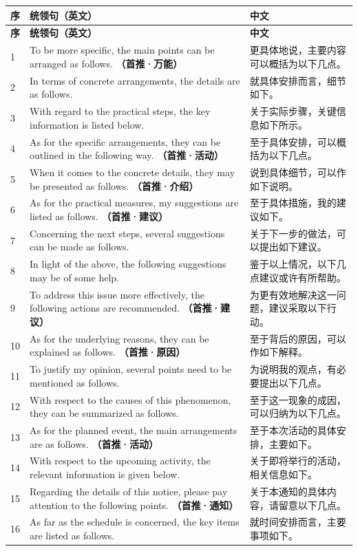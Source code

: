 \documentclass[11pt,a4paper]{ctexart}
\newcommand{\kw}[1]{{\bfseries\color{accent}#1}}
\begin{document}
\begin{longtable}{L{0.9cm}L{10.4cm}L{4.5cm}}
\toprule
\textbf{序} & \textbf{统领句（英文）} & \textbf{中文} \\
\midrule
\endfirsthead
\toprule
\textbf{序} & \textbf{统领句（英文）} & \textbf{中文} \\
\midrule
\endhead
\bottomrule
\endlastfoot

1 & To be more specific, the main points can be arranged as follows. \kw{（首推·万能）} & 更具体地说，主要内容可以概括为以下几点。 \\
2 & In terms of concrete arrangements, the details are as follows. & 就具体安排而言，细节如下。 \\
3 & With regard to the practical steps, the key information is listed below. & 关于实际步骤，关键信息如下所示。 \\
4 & As for the specific arrangements, they can be outlined in the following way. \kw{（首推·活动）} & 至于具体安排，可以概括为以下几点。 \\
5 & When it comes to the concrete details, they may be presented as follows. \kw{（首推·介绍）} & 说到具体细节，可以作如下说明。 \\
6 & As for the practical measures, my suggestions are listed as follows. \kw{（首推·建议）} & 至于具体措施，我的建议如下。 \\
7 & Concerning the next steps, several suggestions can be made as follows. & 关于下一步的做法，可以提出如下建议。 \\
8 & In light of the above, the following suggestions may be of some help. & 鉴于以上情况，以下几点建议或许有所帮助。 \\
9 & To address this issue more effectively, the following actions are recommended. \kw{（首推·建议）} & 为更有效地解决这一问题，建议采取以下行动。 \\
10 & As for the underlying reasons, they can be explained as follows. \kw{（首推·原因）} & 至于背后的原因，可以作如下解释。 \\
11 & To justify my opinion, several points need to be mentioned as follows. & 为说明我的观点，有必要提出以下几点。 \\
12 & With respect to the causes of this phenomenon, they can be summarized as follows. & 至于这一现象的成因，可以归纳为以下几点。 \\
13 & As for the planned event, the main arrangements are as follows. \kw{（首推·活动）} & 至于本次活动的具体安排，主要如下。 \\
14 & With respect to the upcoming activity, the relevant information is given below. & 关于即将举行的活动，相关信息如下。 \\
15 & Regarding the details of this notice, please pay attention to the following points. \kw{（首推·通知）} & 关于本通知的具体内容，请留意以下几点。 \\
16 & As far as the schedule is concerned, the key items are listed as follows. & 就时间安排而言，主要事项如下。 \\

\end{longtable}
\end{document}

